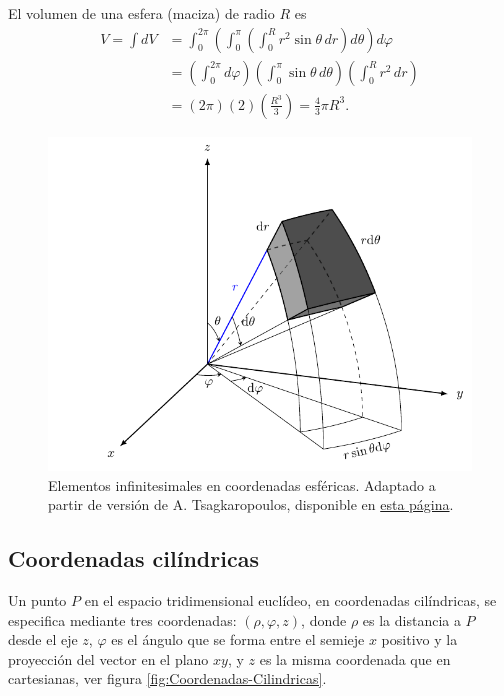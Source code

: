 \begin{ejemplo}
    El volumen de una esfera (maciza) de radio $R$ es 
    \begin{align*}
        V = \int dV &= \int_0^{2\pi} \left( \int_0^{\pi} \left( \int_0^R r^2 \sin \theta \,dr \right)d\theta \right) d\varphi \\
        &= \left( \int_0^{2\pi} d\varphi\right) \left(\int_0^{\pi} \sin \theta \,d\theta \right) \left(\int_0^R r^2 \,dr \right) \\
        &= (2\pi) (2) \left(\frac{R^3}{3} \right) = \frac{4}{3} \pi R^3.
    \end{align*}
\end{ejemplo}

\begin{figure}[H]
    \centering
    \includegraphics[scale = 1]{Figuras/volumen-esfericas.pdf}
    \caption{Elementos infinitesimales en coordenadas esféricas. Adaptado a partir de versión de A. Tsagkaropoulos, disponible en \href{https://tikz.net/spherical_volume/}{esta página}.}
    \label{fig:Vol-Esfericas}
\end{figure}

\subsection{Coordenadas cilíndricas}

Un punto $P$ en el espacio tridimensional euclídeo, en coordenadas cilíndricas, se especifica mediante tres coordenadas: $(\rho, \varphi, z)$, donde $\rho$ es la distancia a $P$ desde el eje $z$, $\varphi$ es el ángulo que se forma entre el semieje $x$ positivo y la proyección del vector en el plano $xy$, y $z$ es la misma coordenada que en cartesianas, ver figura \ref{fig:Coordenadas-Cilindricas}.


